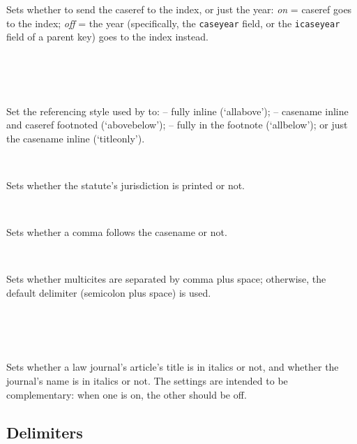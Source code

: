 Sets whether to send the caseref to the index, or just the year: \textit{on} = caseref goes to the index; \textit{off} = the year (specifically, the \texttt{caseyear} field, or the \texttt{icaseyear} field of a parent key) goes to the index instead.
\bigskip
	


 \\
 \\
 \\

Set the referencing style used by \texttt{} to: -- fully inline (`allabove'); -- casename inline and caseref footnoted (`abovebelow'); -- fully in the footnote (`allbelow'); or just the casename inline (`titleonly'). 
\bigskip
	
 \\

Sets whether the statute's jurisdiction is printed or not.
\bigskip


 \\

Sets whether a comma follows the casename or not.
\bigskip

 \\

Sets whether multicites are separated by comma plus space; otherwise, the default delimiter (semicolon plus space) is used.
\bigskip

 \\
 \\
 \\

Sets whether a law journal's article's title is in italics or not, and whether the journal's name is in italics or not. The settings are intended to be complementary: when one is on, the other should be off.
\bigskip





\subsection{Delimiters}


